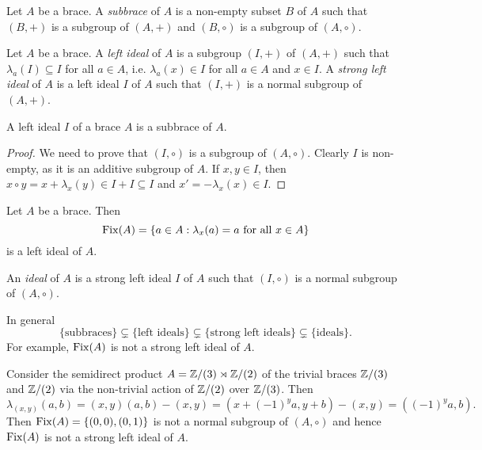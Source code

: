 \begin{definition}
Let $A$ be a brace. A \emph{subbrace} of $A$ is a non-empty 
subset $B$ of $A$ such that $(B,+)$ is a subgroup of $(A,+)$ and $(B,\circ)$ is a subgroup of $(A,\circ)$. 
\end{definition}

\begin{definition}
    Let $A$ be a brace. A \emph{left ideal} of $A$ is a subgroup $(I,+)$ of
	$(A,+)$ such that $\lambda_a(I)\subseteq I$ for all $a\in A$, i.e. $\lambda_a(x)\in I$ for all $a\in A$ and $x\in I$. A \emph{strong left ideal} of $A$ 
	is a left ideal $I$ of $A$ such that $(I,+)$ is a normal subgroup of $(A,+)$. 
\end{definition}

\begin{proposition}
    A left ideal $I$ of a brace $A$ is a subbrace of $A$. 
\end{proposition}

\begin{proof}
    We need to prove that $(I,\circ)$ is a subgroup of $(A,\circ)$. Clearly $I$ is non-empty, 
    as it is an additive subgroup of $A$. If $x,y\in I$, then
    $x\circ y=x+\lambda_x(y)\in I+I\subseteq I$ and $x'=-\lambda_x(x)\in I$. 
\end{proof}

\begin{example}
    Let $A$ be a brace. Then 
    \[
    \operatorname{Fix}(A)=\{a\in A:\lambda_x(a)=a\text{ for all $x\in A$}\}
    \]
    is a left ideal of $A$. 
\end{example}

\begin{definition}
    An \emph{ideal} of $A$ is a strong left ideal $I$ of $A$ such that 
	$(I,\circ)$ is a normal subgroup of $(A,\circ)$. 
\end{definition}

In general 
\[
\{\text{subbraces}\}\subsetneq \{\text{left ideals}\}\subsetneq\{\text{strong left ideals}\}\subsetneq\{\text{ideals}\}.
\]
For example, $\operatorname{Fix}(A)$ is not a strong left ideal of $A$.

\begin{example}
    Consider the semidirect product $A=\mathbb{Z}/(3)\rtimes \mathbb{Z}/(2)$ of the
    trivial braces $\mathbb{Z}/(3)$ and $\mathbb{Z}/(2)$
    via the non-trivial action of $\mathbb{Z}/(2)$ over $\mathbb{Z}/(3)$.
    Then 
    \[
    \lambda_{(x,y)}(a,b)=(x,y)(a,b)-(x,y)=(x+(-1)^ya,y+b)-(x,y)=((-1)^ya,b).
    \]
    Then $\operatorname{Fix}(A)=\{(0,0),(0,1)\}$ is not a 
    normal subgroup of $(A,\circ)$ and hence $\operatorname{Fix}(A)$ is not a strong left 
    ideal of $A$.
\end{example}

